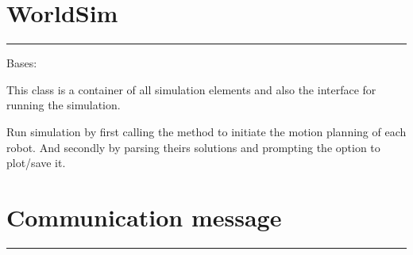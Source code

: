 \documentclass[letterpaper,10pt,english]{sphinxmanual}
\begin{document}
\section{WorldSim}
\label{Multi-robot motion planner:worldsim}

\bigskip\hrule{}\bigskip


\begin{fulllineitems}
\label{Multi-robot motion planner:planning_sim.WorldSim}
Bases: \href{http://docs.python.org/library/functions.html\#object}{}

This class is a container of all simulation elements and also the
interface for running the simulation.

\begin{fulllineitems}
\label{Multi-robot motion planner:planning_sim.WorldSim.run}
Run simulation by first calling the \href{http://docs.python.org/library/multiprocessing.html\#multiprocessing.Process.start}{} method to
initiate the motion planning of each robot. And secondly by parsing theirs solutions and
prompting the option to plot/save it.

\end{fulllineitems}


\end{fulllineitems}



\section{Communication message}
\label{Multi-robot motion planner:communication-message}

\bigskip\hrule{}\bigskip

\end{document}

